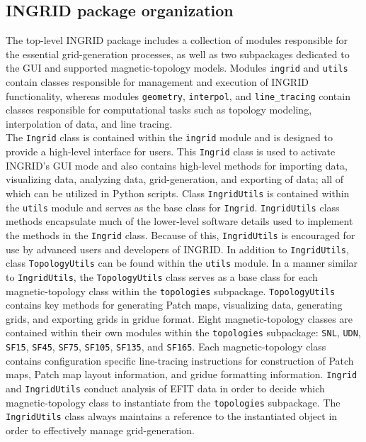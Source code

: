 \subsection{\label{sec:label2}INGRID package organization}
The top-level INGRID package includes a collection of modules responsible for the essential grid-generation processes, as well as two subpackages dedicated to the GUI and supported magnetic-topology models. Modules \texttt{ingrid} and \texttt{utils} contain classes responsible for management and execution of INGRID functionality, whereas modules \texttt{geometry}, \texttt{interpol}, and \texttt{line\_tracing} contain classes responsible for computational tasks such as topology modeling, interpolation of data, and line tracing. \\ \indent
The \texttt{Ingrid} class is contained within the \texttt{ingrid} module and is designed to provide a high-level interface for users. This \texttt{Ingrid} class is used to activate INGRID's GUI mode and also contains high-level methods for importing data, visualizing data, analyzing data, grid-generation, and exporting of data; all of which can be utilized in Python scripts. Class \texttt{IngridUtils} is contained within the \texttt{utils} module and serves as the base class for \texttt{Ingrid}. \texttt{IngridUtils} class methods encapsulate much of the lower-level software details used to implement the methods in the \texttt{Ingrid} class. Because of this, \texttt{IngridUtils} is encouraged for use by advanced users and developers of INGRID. In addition to \texttt{IngridUtils}, class \texttt{TopologyUtils} can be found within the \texttt{utils} module. In a manner similar to \texttt{IngridUtils}, the \texttt{TopologyUtils} class serves as a base class for each magnetic-topology class within the \texttt{topologies} subpackage. \texttt{TopologyUtils} contains key methods for generating Patch maps, visualizing data, generating grids, and exporting grids in gridue format. Eight magnetic-topology classes are contained within their own modules within the \texttt{topologies} subpackage: \texttt{SNL}, \texttt{UDN}, \texttt{SF15}, \texttt{SF45}, \texttt{SF75}, \texttt{SF105}, \texttt{SF135}, and \texttt{SF165}. Each magnetic-topology class contains configuration specific line-tracing instructions for construction of Patch maps, Patch map layout information, and gridue formatting information. \texttt{Ingrid} and \texttt{IngridUtils} conduct analysis of EFIT data in order to decide which magnetic-topology class to instantiate from the \texttt{topologies} subpackage. The \texttt{IngridUtils} class always maintains a reference to the instantiated object in order to effectively manage grid-generation.\\ \indent
